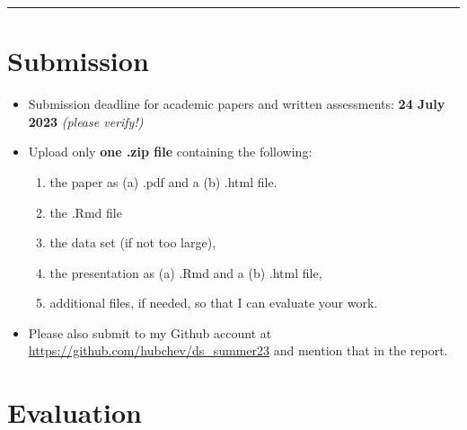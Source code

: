 \documentclass[
  12pt,
]{article}
\providecommand{\tightlist}{%
  \setlength{\itemsep}{0pt}\setlength{\parskip}{0pt}}
\begin{document}
\begin{center}\rule{0.5\linewidth}{0.5pt}\end{center}

\hypertarget{submission}{%
\section{Submission}\label{submission}}

\begin{itemize}
\tightlist
\item
  Submission deadline for academic papers and written assessments: \textbf{24 July 2023} \emph{(please verify!)}
\item
  Upload only \textbf{one .zip file} containing the following:

  \begin{enumerate}
  \def\labelenumi{\arabic{enumi}.}
  \tightlist
  \item
    the paper as (a) .pdf and a (b) .html file.
  \item
    the .Rmd file
  \item
    the data set (if not too large),
  \item
    the presentation as (a) .Rmd and a (b) .html file,
  \item
    additional files, if needed, so that I can evaluate your work.
  \end{enumerate}
\item
  Please also submit to my Github account at \url{https://github.com/hubchev/ds_summer23} and mention that in the report.
\end{itemize}

\hypertarget{evaluation}{%
\section{Evaluation}\label{evaluation}}
\end{document}
